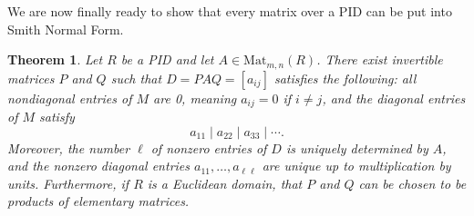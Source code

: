 \documentclass[12pt]{report}
\newtheorem{theorem}{Theorem}[chapter]
\numberwithin{equation}{section}
\numberwithin{theorem}{chapter}
\theoremstyle{definition}
\newtheorem*{basic properties}{Basic Properties}
\newtheorem*{Important Remark}{Important Remark}
\begin{document}
We are now finally ready to show that every matrix over a PID can be put into Smith Normal Form.


\begin{theorem}
 Let $R$ be a PID and let $A \in \mathrm{Mat}_{m,n}(R)$. There exist invertible matrices $P$ and $Q$ such that $D = PAQ = [a_{ij}]$ satisfies the following: all nondiagonal entries of $M$ are 0, meaning $a_{ij} = 0$ if $i \neq j$, and the diagonal entries of $M$ satisfy 
$$a_{11} \mid a_{22} \mid a_{33} \mid \cdots.$$ 
Moreover, the number $\ell$ of nonzero entries of $D$ is uniquely determined by $A$, and the nonzero diagonal entries $a_{11},\ldots, a_{\ell \ell}$ are unique up to multiplication by units.
Furthermore, if $R$ is a Euclidean domain, that $P$ and $Q$ can be chosen to be products of elementary matrices.
\end{theorem}
\end{document}
